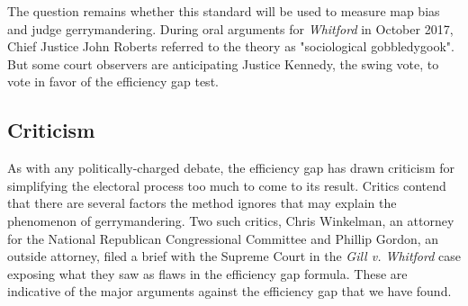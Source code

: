 \documentclass[sigconf]{acmart}
\begin{document}
The question remains whether this standard will be used to measure map bias and judge gerrymandering. During oral arguments for \textit{Whitford} in October 2017, Chief Justice John Roberts referred to the theory as "sociological gobbledygook".\cite{gilltranscript} But some court observers are anticipating Justice Kennedy, the swing vote, to vote in favor of the efficiency gap test.\cite{analysis}

\subsection{Criticism}

As with any politically-charged debate, the efficiency gap has drawn criticism for simplifying the electoral process too much to come to its result. Critics contend that there are several factors the method ignores that may explain the phenomenon of gerrymandering. Two such critics, Chris Winkelman, an attorney for the National Republican Congressional Committee and Phillip Gordon, an outside attorney, filed a brief with the Supreme Court in the \textit{Gill v. Whitford} case exposing what they saw as flaws in the efficiency gap formula.\cite{winkelman} These are indicative of the major arguments against the efficiency gap that we have found.
\end{document}
